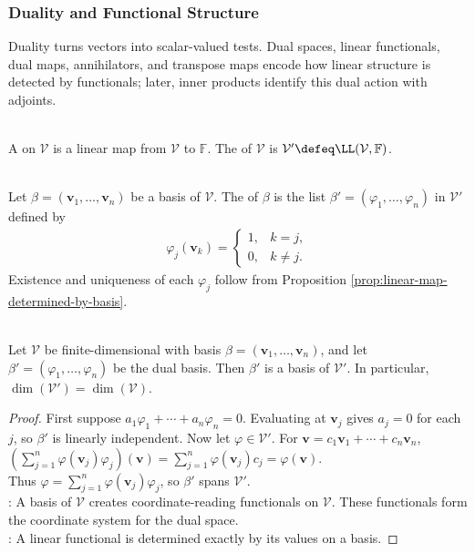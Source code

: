 \subsubsection{Duality and Functional Structure}

Duality turns vectors into scalar-valued tests. Dual spaces, linear functionals, dual maps, annihilators, and transpose maps encode how linear structure is detected by functionals; later, inner products identify this dual action with adjoints.

\begin{definition} \\
A  on $\mathcal{V}$ is a linear map from $\mathcal{V}$ to $\mathbb{F}$. The  of $\mathcal{V}$ is $\mathcal{V}' \defeq \LL(\mathcal{V},\mathbb{F})$.
\end{definition}

\begin{definition} \\
Let $\beta=(\mathbf{v}_1,\ldots,\mathbf{v}_n)$ be a basis of $\mathcal{V}$. The  of $\beta$ is the list $\beta'=(\varphi_1,\ldots,\varphi_n)$ in $\mathcal{V}'$ defined by
\begin{align}
\varphi_j(\mathbf{v}_k)=
\begin{cases}
1, & k=j,\\
0, & k\neq j.
\end{cases}
\nonumber
\end{align}
Existence and uniqueness of each $\varphi_j$ follow from Proposition \ref{prop:linear-map-determined-by-basis}.
\end{definition}

\begin{theorem} \label{thm:dual-basis-and-dimension} \\
Let $\mathcal{V}$ be finite-dimensional with basis $\beta=(\mathbf{v}_1,\ldots,\mathbf{v}_n)$, and let $\beta'=(\varphi_1,\ldots,\varphi_n)$ be the dual basis. Then $\beta'$ is a basis of $\mathcal{V}'$. In particular, $\dim(\mathcal{V}')=\dim(\mathcal{V})$.
\begin{proof}
First suppose $a_1\varphi_1+\cdots+a_n\varphi_n=0$. Evaluating at $\mathbf{v}_j$ gives $a_j=0$ for each $j$, so $\beta'$ is linearly independent. Now let $\varphi\in\mathcal{V}'$. For $\mathbf{v}=c_1\mathbf{v}_1+\cdots+c_n\mathbf{v}_n$, $\left(\sum\limits_{j=1}^n \varphi(\mathbf{v}_j)\varphi_j\right)(\mathbf{v}) =\sum\limits_{j=1}^n \varphi(\mathbf{v}_j)c_j =\varphi(\mathbf{v})$.\\
Thus $\varphi=\sum_{j=1}^n \varphi(\mathbf{v}_j)\varphi_j$, so $\beta'$ spans $\mathcal{V}'$.\\
: A basis of $\mathcal{V}$ creates coordinate-reading functionals on $\mathcal{V}$. These functionals form the coordinate system for the dual space.\\
: A linear functional is determined exactly by its values on a basis.
\end{proof}
\end{theorem}

